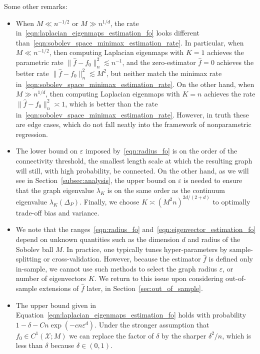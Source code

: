 \documentclass{article}
\newcommand{\1}{\mathbf{1}}
\newcommand{\mc}[1]{\mathcal{#1}}
\newcommand{\wh}[1]{\widehat{#1}}
\theoremstyle{alden}
\theoremstyle{aldenthm}
\theoremstyle{definition}
\theoremstyle{remark}
\begin{document}
Some other remarks:
\begin{itemize}
	\item When $M \ll n^{-1/2}$ or $M \gg n^{1/d}$, the rate in~\eqref{eqn:laplacian_eigenmaps_estimation_fo} looks different than~\eqref{eqn:sobolev_space_minimax_estimation_rate}. In particular, when $M \ll n^{-1/2}$, then computing Laplacian eigenmaps with $K = 1$ achieves the parametric rate $\|\wh{f} - f_0\|_n^2 \lesssim n^{-1}$, and the zero-estimator $\wh{f} = 0$ achieves the better rate $\|\wh{f} - f_0\|_n^2 \lesssim M^2$, but neither match the minimax rate in~\eqref{eqn:sobolev_space_minimax_estimation_rate}. On the other hand, when $M \gg n^{1/d}$, then computing Laplacian eigenmaps with $K = n$ achieves the rate $\|\wh{f} - f_0\|_n^2 \asymp 1$, which is better than the rate in~\eqref{eqn:sobolev_space_minimax_estimation_rate}. However, in truth these are edge cases, which do not fall neatly into the framework of nonparametric regression.
	\item The lower bound on $\varepsilon$ imposed by~\eqref{eqn:radius_fo} is on the order of the connectivity threshold, the smallest length scale at which the resulting graph will still, with high probability, be connected. On the other hand, as we will see in Section~\ref{subsec:analysis}, the upper bound on $\varepsilon$ is needed to ensure that the graph eigenvalue $\lambda_K$ is on the same order as the continuum eigenvalue $\lambda_K(\Delta_P)$. Finally, we choose $K \asymp (M^2n)^{2d/(2 + d)}$ to optimally trade-off bias and variance.
	\item We note that the ranges~\eqref{eqn:radius_fo} and~\eqref{eqn:eigenvector_estimation_fo} depend on unknown quantities such as the dimension $d$ and radius of the Sobolev ball $M$. In practice, one typically tunes hyper-parameters by sample-splitting or cross-validation. However, because the estimator $\wh{f}$ is defined only in-sample, we cannot use such methods to select the graph radius $\varepsilon$, or number of eigenvectors $K$. We return to this issue upon considering out-of-sample extensions of $\wh{f}$ later, in Section~\ref{sec:out_of_sample}.
	\item The upper bound given in Equation~\eqref{eqn:laplacian_eigenmaps_estimation_fo} holds with probability $1 - \delta - Cn\exp(-cn\varepsilon^d)$. Under the stronger assumption that $f_0 \in C^1(\mc{X};M)$ we can replace the factor of $\delta$ by the sharper $\delta^2/n$, which is less than $\delta$ because $\delta \in (0,1)$. 
\end{itemize}
\end{document}
